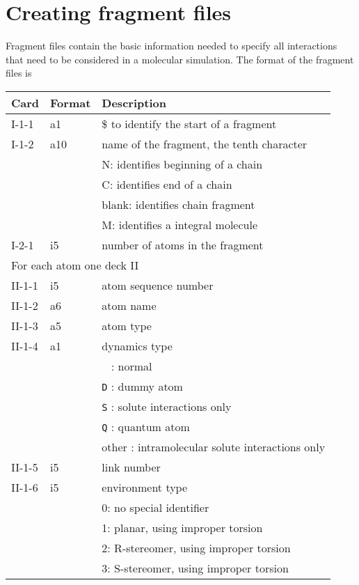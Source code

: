 \section{Creating fragment files}
Fragment files contain the basic information needed to specify all
interactions that need to be considered in a molecular simulation.
The format of the fragment files is
\begin{center}
\begin{tabular}{lll}
\hline\hline
Card & Format & Description \\ \hline
I-1-1  & a1     & \$ to identify the start of a fragment \\ %
I-1-2  & a10    & name of the fragment, the tenth character\\
       &        & N: identifies beginning of a chain\\
       &        & C: identifies end of a chain\\
       &        & blank: identifies chain fragment\\
       &        & M: identifies a integral molecule\\
\hline
I-2-1  & i5     & number of atoms in the fragment\\ 
\hline
\multicolumn{3}{l}{For each atom one deck II} \\
\hline
II-1-1  & i5     & atom sequence number \\
II-1-2  & a6     & atom name \\
II-1-3  & a5     & atom type \\
II-1-4  & a1     & dynamics type\\
        &        & \verb+ + : normal\\
        &        & \verb+D+ : dummy atom\\
        &        & \verb+S+ : solute interactions only\\
        &        & \verb+Q+ : quantum atom\\
        &        & other : intramolecular solute interactions only\\
II-1-5  & i5     & link number\\
II-1-6  & i5     & environment type\\
        &        & 0: no special identifier\\
        &        & 1: planar, using improper torsion\\
        &        & 2: R-stereomer, using improper torsion\\
        &        & 3: S-stereomer, using improper torsion\\

\end{tabular}
\end{center}
